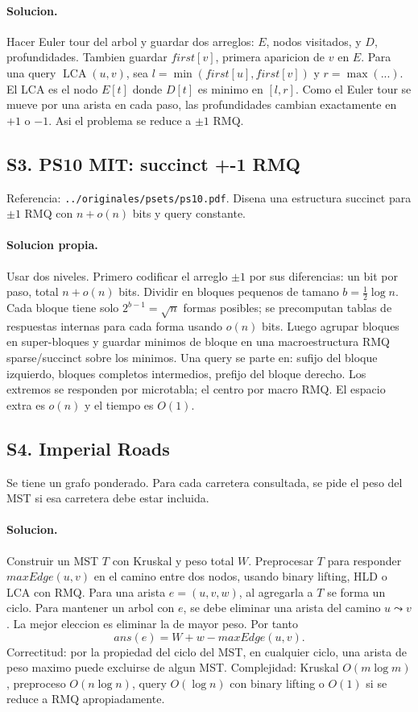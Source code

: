 \documentclass[10pt]{article}
\newcommand{\bigO}{O}
\newcommand{\LCA}{\operatorname{LCA}}
\begin{document}
\paragraph{Solucion.}
Hacer Euler tour del arbol y guardar dos arreglos: $E$, nodos visitados, y $D$,
profundidades. Tambien guardar $first[v]$, primera aparicion de $v$ en $E$. Para
una query $\LCA(u,v)$, sea $l=\min(first[u],first[v])$ y $r=\max(...)$. El LCA es
el nodo $E[t]$ donde $D[t]$ es minimo en $[l,r]$. Como el Euler tour se mueve por
una arista en cada paso, las profundidades cambian exactamente en $+1$ o $-1$.
Asi el problema se reduce a $\pm 1$ RMQ.

\subsection*{S3. PS10 MIT: succinct +-1 RMQ}
Referencia: \texttt{../originales/psets/ps10.pdf}. Disena una estructura
succinct para $\pm 1$ RMQ con $n+o(n)$ bits y query constante.

\paragraph{Solucion propia.}
Usar dos niveles. Primero codificar el arreglo $\pm 1$ por sus diferencias:
un bit por paso, total $n+o(n)$ bits. Dividir en bloques pequenos de tamano
$b=\frac12\log n$. Cada bloque tiene solo $2^{b-1}=\sqrt n$ formas posibles; se
precomputan tablas de respuestas internas para cada forma usando
$o(n)$ bits. Luego agrupar bloques en super-bloques y guardar minimos de bloque
en una macroestructura RMQ sparse/succinct sobre los minimos. Una query se parte
en: sufijo del bloque izquierdo, bloques completos intermedios, prefijo del
bloque derecho. Los extremos se responden por microtabla; el centro por macro
RMQ. El espacio extra es $o(n)$ y el tiempo es $\bigO(1)$.

\subsection*{S4. Imperial Roads}
Se tiene un grafo ponderado. Para cada carretera consultada, se pide el peso del
MST si esa carretera debe estar incluida.

\paragraph{Solucion.}
Construir un MST $T$ con Kruskal y peso total $W$. Preprocesar $T$ para responder
$maxEdge(u,v)$ en el camino entre dos nodos, usando binary lifting, HLD o LCA con
RMQ. Para una arista $e=(u,v,w)$, al agregarla a $T$ se forma un ciclo. Para
mantener un arbol con $e$, se debe eliminar una arista del camino $u\leadsto v$.
La mejor eleccion es eliminar la de mayor peso. Por tanto
\[
ans(e)=W+w-maxEdge(u,v).
\]
Correctitud: por la propiedad del ciclo del MST, en cualquier ciclo, una arista
de peso maximo puede excluirse de algun MST. Complejidad: Kruskal
$\bigO(m\log m)$, preproceso $\bigO(n\log n)$, query $\bigO(\log n)$ con binary
lifting o $\bigO(1)$ si se reduce a RMQ apropiadamente.
\end{document}
